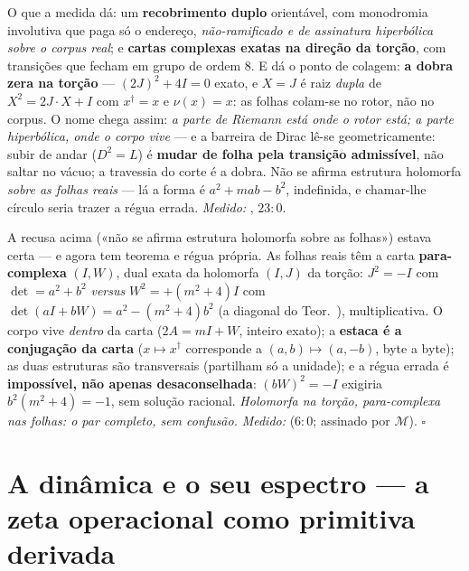 \documentclass[livro.tex]{subfiles}
\begin{document}
\begin{observacao}\label{obs:riemann}
O que a medida dá: um \textbf{recobrimento duplo} orientável, com
monodromia involutiva que paga só o endereço, \emph{não-ramificado e de
assinatura hiperbólica sobre o corpus real}; e \textbf{cartas complexas
exatas na direção da torção}, com transições que fecham em grupo de
ordem $8$. E dá o ponto de colagem: \textbf{a dobra zera na torção} ---
$(2J)^{2}+4I=0$ exato, e $X=J$ é raiz \emph{dupla} de $X^{2}=2J\cdot
X+I$ com $x^{\dagger}=x$ e $\nu(x)=x$: as folhas colam-se no rotor, não
no corpus. O nome chega assim: \emph{a parte de Riemann está onde o
rotor está; a parte hiperbólica, onde o corpo vive} --- e a barreira de
Dirac lê-se geometricamente: subir de andar ($D^{2}=L$) é
\textbf{mudar de folha pela transição admissível}, não saltar no vácuo;
a travessia do corte é a dobra. Não se afirma estrutura holomorfa
\emph{sobre as folhas reais} --- lá a forma é $a^{2}+mab-b^{2}$,
indefinida, e chamar-lhe círculo seria trazer a régua errada.
\emph{Medido:} , $23{:}0$.
\end{observacao}

\begin{teorema}\label{thm:paracomplexo}
A recusa acima («não se afirma estrutura holomorfa sobre as folhas»)
estava certa --- e agora tem teorema e régua própria. As folhas reais
têm a carta \textbf{para-complexa} $(I,W)$, dual exata da holomorfa
$(I,J)$ da torção: $J^{2}=-I$ com $\det=a^{2}{+}b^{2}$ \emph{versus}
$W^{2}=+(m^{2}{+}4)I$ com $\det(aI{+}bW)=a^{2}-(m^{2}{+}4)b^{2}$ (a
diagonal do Teor.~), multiplicativa. O corpo vive
\emph{dentro} da carta ($2A=mI+W$, inteiro exato); a \textbf{estaca é
a conjugação da carta} ($x\mapsto x^{\dagger}$ corresponde a
$(a,b)\mapsto(a,-b)$, byte a byte); as duas estruturas são
transversais (partilham só a unidade); e a régua errada é
\textbf{impossível, não apenas desaconselhada}: $(bW)^{2}=-I$ exigiria
$b^{2}(m^{2}{+}4)=-1$, sem solução racional. \emph{Holomorfa na
torção, para-complexa nas folhas: o par completo, sem confusão.}
\emph{Medido:}  ($6{:}0$; assinado por
$\mathcal{M}$).
$\square$
\end{teorema}

\section{A dinâmica e o seu espectro --- a zeta operacional como
primitiva derivada}\label{sec:zeta-dinamica}
\end{document}
